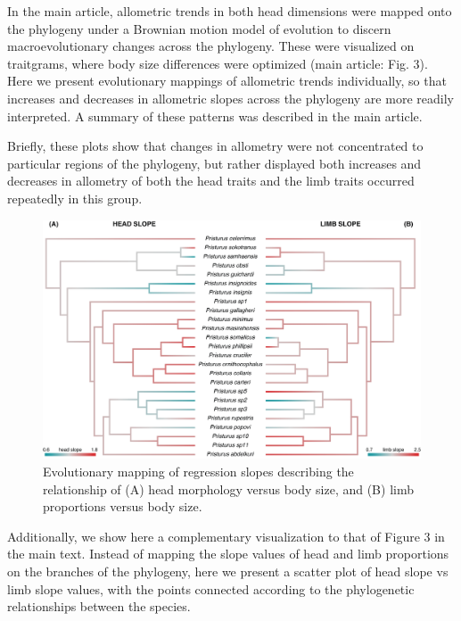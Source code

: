 \documentclass[
  11pt,
]{article}
\begin{document}
In the main article, allometric trends in both head dimensions were
mapped onto the phylogeny under a Brownian motion model of evolution to
discern macroevolutionary changes across the phylogeny. These were
visualized on traitgrams, where body size differences were optimized
(main article: Fig. 3). Here we present evolutionary mappings of
allometric trends individually, so that increases and decreases in
allometric slopes across the phylogeny are more readily interpreted. A
summary of these patterns was described in the main article.

Briefly, these plots show that changes in allometry were not
concentrated to particular regions of the phylogeny, but rather
displayed both increases and decreases in allometry of both the head
traits and the limb traits occurred repeatedly in this group.

\begin{figure}[H]

{\centering \includegraphics[width=1\linewidth]{Figs/contmap_slopes} 

}

\caption{Evolutionary mapping of regression slopes describing the relationship of (A) head morphology versus body size, and (B) limb proportions versus body size.}\label{fig:unnamed-chunk-6}
\end{figure}

Additionally, we show here a complementary visualization to that of
Figure 3 in the main text. Instead of mapping the slope values of head
and limb proportions on the branches of the phylogeny, here we present a
scatter plot of head slope vs limb slope values, with the points
connected according to the phylogenetic relationships between the
species.
\end{document}
